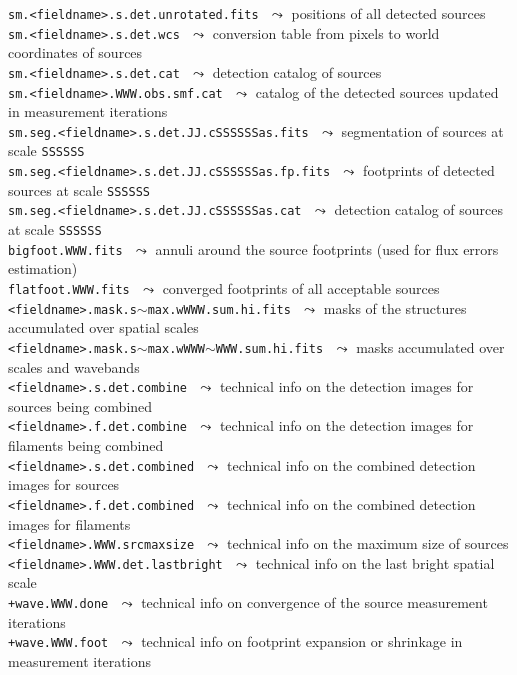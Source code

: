 \documentclass[a4paper,10pt]{article}
\begin{document}
{\small\verb!sm.<fieldname>.s.det.unrotated.fits!} $\,\,\leadsto$ positions of all detected sources\\
{\small\verb!sm.<fieldname>.s.det.wcs!} $\,\,\leadsto$ conversion table from pixels to world coordinates of sources\\
{\small\verb!sm.<fieldname>.s.det.cat!} $\,\,\leadsto$ detection catalog of sources\\
{\small\verb!sm.<fieldname>.WWW.obs.smf.cat!} $\,\,\leadsto$ catalog of the detected sources updated in measurement iterations\\
{\small\verb!sm.seg.<fieldname>.s.det.JJ.cSSSSSSas.fits!} $\,\,\leadsto$ segmentation of sources at scale \verb!SSSSSS!\\
{\small\verb!sm.seg.<fieldname>.s.det.JJ.cSSSSSSas.fp.fits!} $\,\,\leadsto$ footprints of detected sources at scale \verb!SSSSSS!\\
{\small\verb!sm.seg.<fieldname>.s.det.JJ.cSSSSSSas.cat!} $\,\,\leadsto$ detection catalog of sources at scale \verb!SSSSSS!\\
{\small\verb!bigfoot.WWW.fits!} $\,\,\leadsto$ annuli around the source footprints (used for flux errors estimation)\\
{\small\verb!flatfoot.WWW.fits!} $\,\,\leadsto$ converged footprints of all acceptable sources\\
{\small\verb!<fieldname>.mask.s!$\sim$\verb!max.wWWW.sum.hi.fits!} $\,\,\leadsto$ masks of the structures accumulated over spatial scales\\
{\small\verb!<fieldname>.mask.s!$\sim$\verb!max.wWWW!$\sim$\verb!WWW.sum.hi.fits!} $\,\,\leadsto$ masks accumulated over scales and wavebands\\
{\small\verb!<fieldname>.s.det.combine!} $\,\,\leadsto$ technical info on the detection images for sources being combined\\
{\small\verb!<fieldname>.f.det.combine!} $\,\,\leadsto$ technical info on the detection images for filaments being combined\\
{\small\verb!<fieldname>.s.det.combined!} $\,\,\leadsto$ technical info on the combined detection images for sources\\
{\small\verb!<fieldname>.f.det.combined!} $\,\,\leadsto$ technical info on the combined detection images for filaments\\
{\small\verb!<fieldname>.WWW.srcmaxsize!} $\,\,\leadsto$ technical info on the maximum size of sources\\
{\small\verb!<fieldname>.WWW.det.lastbright!} $\,\,\leadsto$ technical info on the last bright spatial scale\\
{\small\verb!+wave.WWW.done!} $\,\,\leadsto$ technical info on convergence of the source measurement iterations\\
{\small\verb!+wave.WWW.foot!} $\,\,\leadsto$ technical info on footprint expansion or shrinkage in measurement iterations
\end{document}
